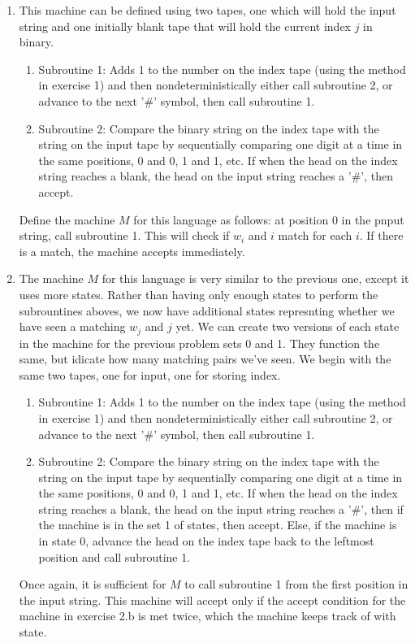 \documentclass[a4paper]{article}
\begin{document}
\begin{enumerate}
\begin{enumerate}
\item This machine can be defined using two tapes, one which will hold the input string and one initially blank tape that will hold the current index $j$ in binary. \\
\begin{enumerate}[i]
\item Subroutine 1: Adds 1 to the number on the index tape (using the method in exercise 1) and then nondeterministically either call subroutine 2, or advance to the next '\#' symbol, then call subroutine 1.
\item Subroutine 2: Compare the binary string on the index tape with the string on the input tape by sequentially comparing one digit at a time in the same positions, 0 and 0, 1 and 1, etc. If when the head on the index string reaches a blank, the head on the input string reaches a '$\#$', then accept. \\
\end{enumerate}
Define the machine $M$ for this language as follows: at position 0 in the pnput string, call subroutine 1. This will check if $w_i$ and $i$ match for each $i$. If there is a match, the machine accepts immediately. \\



\item The machine $M$ for this language is very similar to the previous one, except it uses more states. Rather than having only enough states to perform the subrountines aboves, we now have additional states represnting whether we have seen a matching $w_j$ and $j$ yet. We can create two versions of each state in the machine for the previous problem sets 0 and 1. They function the same, but idicate how many matching pairs we've seen. We begin with the same two tapes, one for input, one for storing index. \\
\begin{enumerate}[i]
\item Subroutine 1: Adds 1 to the number on the index tape (using the method in exercise 1) and then nondeterministically either call subroutine 2, or advance to the next '\#' symbol, then call subroutine 1.
\item Subroutine 2: Compare the binary string on the index tape with the string on the input tape by sequentially comparing one digit at a time in the same positions, 0 and 0, 1 and 1, etc. If when the head on the index string reaches a blank, the head on the input string reaches a '$\#$', then if the machine is in the set 1 of states, then accept. Else, if the machine is in state 0, advance the head on the index tape back to the leftmost position and call subroutine 1. \\
\end{enumerate} 
Once again, it is sufficient for $M$ to call subroutine 1 from the first position in the input string. This machine will accept only if the accept condition for the machine in exercise 2.b is met twice, which the machine keeps track of with state. \\
\end{enumerate}







\end{enumerate}
\end{document}
